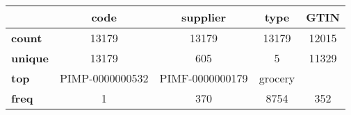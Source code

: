 \begin{tabular}{lcccc}
\toprule
{} &             code &         supplier &     type &   GTIN \\
\midrule
\textbf{count } &            13179 &            13179 &    13179 &  12015 \\
\textbf{unique} &            13179 &              605 &        5 &  11329 \\
\textbf{top   } &  PIMP-0000000532 &  PIMF-0000000179 &  grocery &        \\
\textbf{freq  } &                1 &              370 &     8754 &    352 \\
\bottomrule
\end{tabular}
